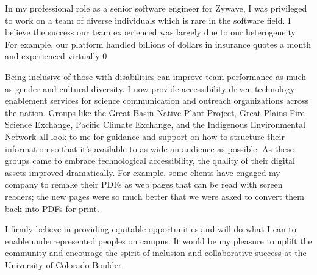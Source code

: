 \documentclass[12pt]{article}
\begin{document}
In my professional role as a senior software engineer for Zywave, I was privileged to work on a team of diverse individuals which is rare in the software field. I believe the success our team experienced was largely due to our heterogeneity. For example, our platform handled billions of dollars in insurance quotes a month and experienced virtually 0%

Being inclusive of those with disabilities can improve team performance as much as gender and cultural diversity. I now provide accessibility-driven technology enablement services for science communication and outreach organizations across the nation. Groups like the Great Basin Native Plant Project, Great Plains Fire Science Exchange, Pacific Climate Exchange, and the Indigenous Environmental Network all look to me for guidance and support on how to structure their information so that it's available to as wide an audience as possible. As these groups came to embrace technological accessibility, the quality of their digital assets improved dramatically. For example, some clients have engaged my company to remake their PDFs as web pages that can be read with screen readers; the new pages were so much better that we were asked to convert them back into PDFs for print.

I firmly believe in providing equitable opportunities and will do what I can to enable underrepresented peoples on campus. It would be my pleasure to uplift the community and encourage the spirit of inclusion and collaborative success at the University of Colorado Boulder.
\end{document}
